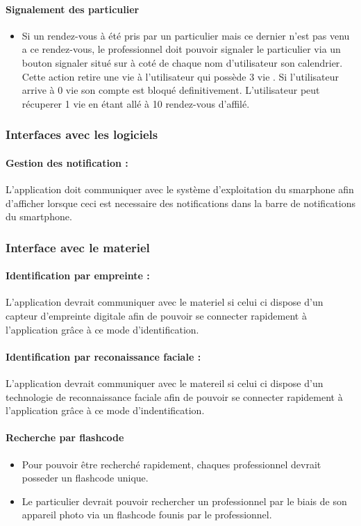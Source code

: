 \documentclass{article}
\begin{document}
\paragraph{Signalement des particulier}
\begin{itemize}
\item Si un rendez-vous à été pris par un particulier mais ce dernier
  n'est pas venu a ce rendez-vous, le professionnel doit pouvoir
  signaler le particulier via un bouton \og signaler \fg{} situé sur
  à coté de chaque nom d'utilisateur son calendrier. Cette action retire une \og vie \fg{} à l'utilisateur qui possède
  3 \og vie \fg{}. Si l'utilisateur arrive à 0 vie son compte est
  bloqué definitivement. L'utilisateur peut récuperer 1 vie en étant
  allé à 10 rendez-vous d'affilé.
\end{itemize}

\subsubsection{Interfaces avec les logiciels}
\paragraph{Gestion des notification :}
L'application doit communiquer avec le système d'exploitation du
smarphone afin d'afficher lorsque ceci est necessaire des
notifications dans la barre de notifications du smartphone.

\subsubsection{Interface avec le materiel}
\paragraph{Identification par empreinte :}
L'application devrait communiquer avec le materiel si celui ci dispose
d'un capteur d'empreinte digitale afin de pouvoir se connecter rapidement à
l'application grâce à ce mode d'identification.
\paragraph{Identification par reconaissance faciale :}
L'application devrait communiquer avec le matereil si celui ci dispose
d'un technologie de reconnaissance faciale afin de pouvoir se
connecter rapidement à l'application grâce à ce mode
d'indentification.
\paragraph{Recherche par flashcode}
\begin{itemize}
\item Pour pouvoir être recherché rapidement, chaques professionnel
  devrait posseder un flashcode unique.
\item Le particulier devrait pouvoir rechercher un professionnel par le
  biais de son appareil photo via un flashcode founis par le
  professionnel.
\end{itemize}
\end{document}
